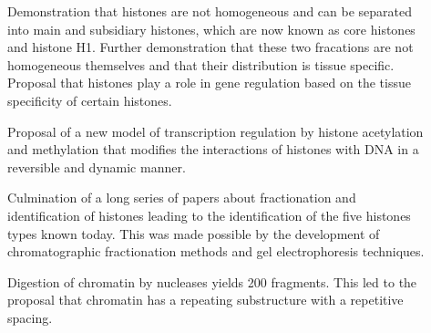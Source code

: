 {\begin{shaded}
\begin{description}
          \item[\cite{stedman1951main-histones-separation}]
            Demonstration that histones are not homogeneous and can be
            separated into main and subsidiary histones,
            which are now known as core histones and histone H1.
            Further demonstration that these two fracations are not
            homogeneous themselves and that
            their distribution is tissue specific.
            Proposal that histones play a role in gene regulation based
            on the tissue specificity of certain histones.

          \item[\cite{allfrey1964acetylation}]
            Proposal of a new model of transcription regulation by
            histone acetylation and methylation that modifies the
            interactions of histones with DNA in a reversible and
            dynamic manner.

          \item[\cite{philips-and-johns1965-fractionation}]
            Culmination of a long series of papers about fractionation and
            identification of histones leading to the identification of
            the five histones types known today.
            This was made possible by the development of chromatographic
            fractionation methods and gel electrophoresis techniques.

          \item[\cite{hewish1973-200bp-pieces}]
            Digestion of chromatin by nucleases yields \SI{200}{\bp}
            fragments.  This led to the proposal that chromatin has a repeating
            substructure with a repetitive spacing.


\end{description}
\end{shaded}}
